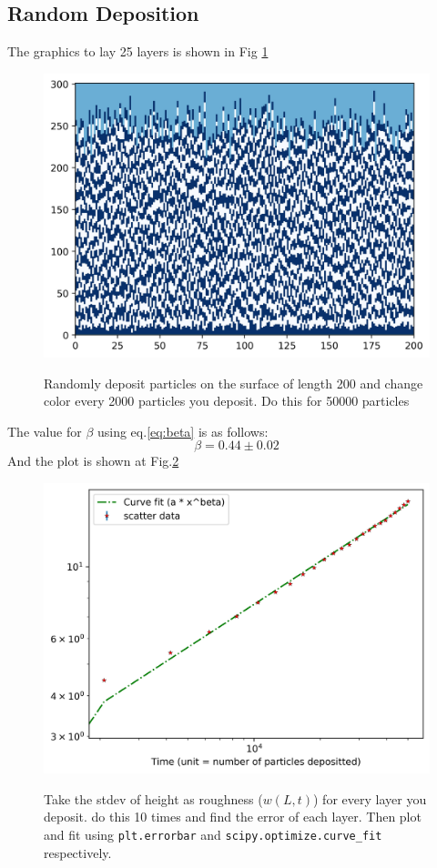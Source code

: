 \documentclass[12pt]{article}
\begin{document}
	\subsection{Random Deposition}
	The graphics to lay 25 layers is shown in Fig \ref{fig:RD25}
	\begin{figure}[h!]
		\centering
		\includegraphics[width=.9\linewidth]{../P4/canvas.jpg}
		\label{fig:RD25}
		\caption{Randomly deposit particles on the surface of length 200 and change  color every 2000 particles you deposit. Do this for 50000 particles}
	\end{figure}
	The value for $\beta$ using eq.\ref{eq:beta} is as follows:
	\begin{equation*}
		\beta = 0.44 \pm 0.02
	\end{equation*}
	And the plot is shown at Fig.\ref{fig:RD25beta}
	\begin{figure}[h!]
				\centering
		\includegraphics[width=.9\linewidth]{../P4/plot_for_beta.jpg}
		\label{fig:RD25beta}
		\caption{Take the stdev of height as roughness ($w(L, t)$) for every layer you deposit.
		do this 10 times and find the error of each layer. Then plot and fit using 
		\texttt{plt.errorbar} and \texttt{scipy.optimize.curve\_fit} respectively.}
	\end{figure}
\end{document}
